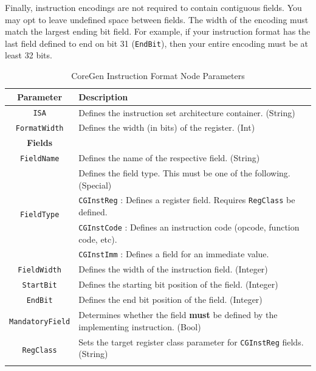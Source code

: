 \documentclass{article}
\begin{document}
Finally, instruction encodings are not required to contain contiguous fields.  You may opt to leave undefined 
space between fields.  The width of the encoding must match the largest ending bit field.  For example, if 
your instruction format has the last field defined to end on bit 31 (\texttt{EndBit}), then your entire encoding must be at least 
32 bits.   

\begin{table}[h]
\begin{center}
\caption{CoreGen Instruction Format Node Parameters}
\vspace{0.125in}
\label{tab:InstFormatParams}
\begin{tabular}{|c|l|}
\hline
\textbf{Parameter} & \textbf{Description}\\
\hline
\texttt{ISA} & Defines the instruction set architecture container. (String)\\
\hline
\texttt{FormatWidth} & Defines the width (in bits) of the register. (Int)\\
\hline
\hline
\textbf{Fields} & \\
\hline
\texttt{FieldName} & Defines the name of the respective field. (String)\\
\hline
\multirow{4}{*}{\texttt{FieldType}} & Defines the field type.  This must be one of the following. (Special)\\
                                                            & \texttt{CGInstReg} : Defines a register field.  Requires \texttt{RegClass} be defined.\\
                                                            & \texttt{CGInstCode} : Defines an instruction code (opcode, function code, etc).\\
                                                            & \texttt{CGInstImm} : Defines a field for an immediate value.\\
\hline
\texttt{FieldWidth} & Defines the width of the instruction field. (Integer)\\
\hline
\texttt{StartBit} & Defines the starting bit position of the field. (Integer)\\
\hline
\texttt{EndBit} & Defines the end bit position of the field. (Integer)\\
\hline
\texttt{MandatoryField} & Determines whether the field \textbf{must} be defined by the implementing instruction. (Bool)\\
\hline
\multirow{2}{*}{\texttt{RegClass}} & Sets the target register class parameter for \texttt{CGInstReg} fields.  (String)\\ & \\
\hline
\end{tabular}
\end{center}
\end{table} 
\end{document}
